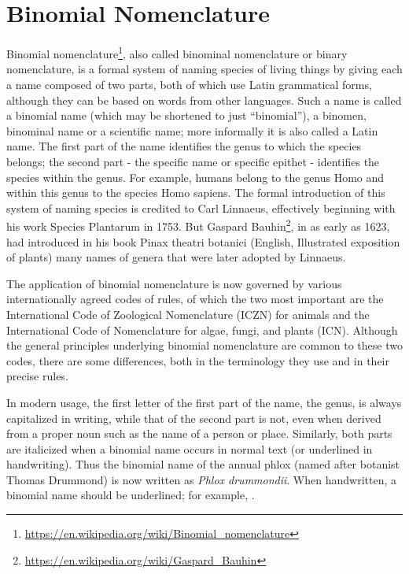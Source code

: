 \documentclass[]{book}
\let\rmarkdownfootnote\footnote%
\def\footnote{\protect\rmarkdownfootnote}
\renewcommand{\href}[2]{#2\footnote{\url{#1}}}
\theoremstyle{definition}
\theoremstyle{definition}
\theoremstyle{definition}
\theoremstyle{remark}
\begin{document}
\section{Binomial Nomenclature}\label{binomial-nomenclature}

\href{https://en.wikipedia.org/wiki/Binomial_nomenclature}{Binomial
nomenclature}, also called binominal nomenclature or binary
nomenclature, is a formal system of naming species of living things by
giving each a name composed of two parts, both of which use Latin
grammatical forms, although they can be based on words from other
languages. Such a name is called a binomial name (which may be shortened
to just ``binomial''), a binomen, binominal name or a scientific name;
more informally it is also called a Latin name. The first part of the
name identifies the genus to which the species belongs; the second part
- the specific name or specific epithet - identifies the species within
the genus. For example, humans belong to the genus Homo and within this
genus to the species Homo sapiens. The formal introduction of this
system of naming species is credited to Carl Linnaeus, effectively
beginning with his work Species Plantarum in 1753. But \href{https://en.wikipedia.org/wiki/Gaspard_Bauhin}{Gaspard Bauhin},
in as early as 1623, had introduced in his book Pinax theatri botanici
(English, Illustrated exposition of plants) many names of genera that
were later adopted by Linnaeus.

The application of binomial nomenclature is now governed by various
internationally agreed codes of rules, of which the two most important
are the International Code of Zoological Nomenclature (ICZN) for animals
and the International Code of Nomenclature for algae, fungi, and plants
(ICN). Although the general principles underlying binomial nomenclature
are common to these two codes, there are some differences, both in the
terminology they use and in their precise rules.

In modern usage, the first letter of the first part of the name, the
genus, is always capitalized in writing, while that of the second part
is not, even when derived from a proper noun such as the name of a
person or place. Similarly, both parts are italicized when a binomial
name occurs in normal text (or underlined in handwriting). Thus the
binomial name of the annual phlox (named after botanist Thomas Drummond)
is now written as \emph{Phlox drummondii}. When handwritten, a binomial name
should be underlined; for example, .
\end{document}
